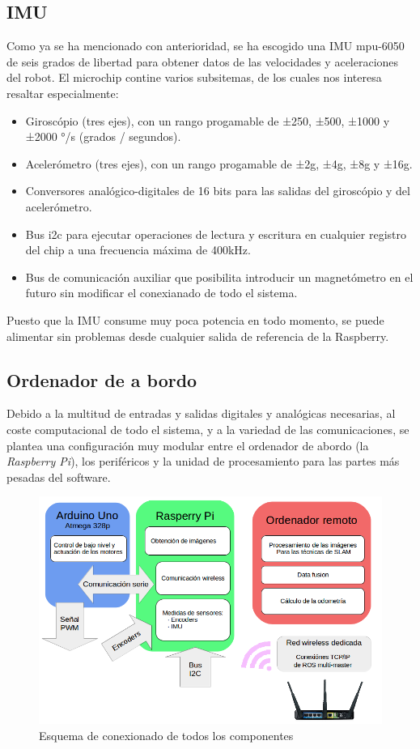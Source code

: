 \subsection{IMU}
Como ya se ha mencionado con anterioridad, se ha escogido una IMU mpu-6050 de seis grados de libertad para obtener datos de las velocidades y aceleraciones del robot. El microchip contine varios subsitemas, de los cuales nos interesa resaltar especialmente:
\begin{itemize}
	\item Giroscópio (tres ejes), con un rango progamable de ±250, ±500, ±1000 y ±2000 °/s (grados / segundos).
	\item Acelerómetro (tres ejes), con un rango progamable de ±2g, ±4g, ±8g y ±16g.
	\item Conversores analógico-digitales de 16 bits para las salidas del giroscópio y del acelerómetro.
	\item Bus i2c para ejecutar operaciones de lectura y escritura en cualquier registro del chip a una frecuencia máxima de 400kHz.
	\item Bus de comunicación auxiliar que posibilita introducir un magnetómetro en el futuro sin modificar el conexianado de todo el sistema.
\end{itemize}
Puesto que la IMU consume muy poca potencia en todo momento, se puede alimentar sin problemas desde cualquier salida de referencia de la Raspberry. 

\subsection{Ordenador de a bordo}
Debido a la multitud de entradas y salidas digitales y analógicas necesarias, al coste computacional de todo el sistema, y a la variedad de las comunicaciones, se plantea una configuración muy modular entre el ordenador de abordo (la \textit{Raspberry Pi}), los periféricos y la unidad de procesamiento para las partes más pesadas del software.\\
  \begin{figure}[h!]
  	\centering
  	\includegraphics[width=.7\textwidth]{images/hw/wheele_esquema}
  	\caption{Esquema de conexionado de todos los componentes}
  \end{figure}\\

